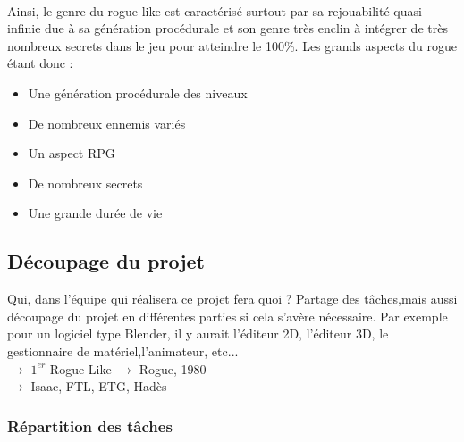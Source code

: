 \documentclass{article}
\begin{document}
\\
Ainsi, le genre du rogue-like est caractérisé surtout par sa rejouabilité quasi-infinie due à sa génération procédurale et son genre très enclin à intégrer de très nombreux secrets dans le jeu pour atteindre le 100\%. Les grands aspects du rogue étant donc :\\
\begin{itemize}
    \item Une génération procédurale des niveaux
    \item De nombreux ennemis variés
    \item Un aspect RPG
    \item De nombreux secrets
    \item Une grande durée de vie
\end{itemize}


\subsection{Découpage du projet}

Qui, dans l’équipe qui réalisera ce projet fera quoi ? Partage des tâches,mais aussi découpage du projet en différentes parties si cela s’avère nécessaire. Par exemple pour un logiciel type Blender, il y aurait l’éditeur 2D, l’éditeur 3D, le gestionnaire de matériel,l’animateur, etc... \\
$\rightarrow$ $1^{er}$ Rogue Like $\rightarrow$ Rogue, 1980 \\
$\rightarrow$ Isaac, FTL, ETG, Hadès

\pagebreak

\subsubsection{Répartition des tâches}
\end{document}
